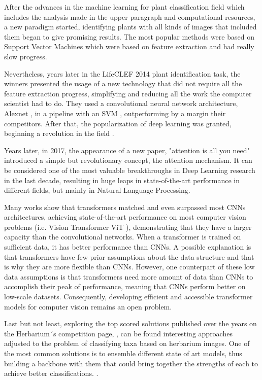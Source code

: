 \documentclass{article}
\begin{document}
After the advances in the machine learning for plant classification field which includes the analysis made in the upper paragraph and computational resources, a new paradigm started, identifying plants with all kinds of images that included them began to give promising results. The most popular methods were based on Support Vector Machines \cite{svm} which were based on feature extraction and had really slow progress. 

Nevertheless, years later in the LifeCLEF 2014 plant identification task, the winners presented the usage of a new technology that did not require all the feature extraction progress, simplifying and reducing all the work the computer scientist had to do. They used a convolutional neural network architecture, Alexnet \cite{alexnet}, in a pipeline with an SVM \cite{lifeclef2014}, outperforming by a margin their competitors. After that, the popularization of deep learning was granted, beginning a revolution in the field \cite{story}.

Years later, in 2017, the appearance of a new paper, "attention is all you need" \cite{transformers} introduced a simple but revolutionary concept, the attention mechanism. It can be considered one of the most valuable breakthroughs in Deep Learning research in the last decade, resulting in huge leaps in state-of-the-art performance in different fields, but mainly in Natural Language Processing.

Many works show that transformers matched and even surpassed most CNNs architectures, achieving state-of-the-art performance on most computer vision problems (i.e. Vision Transformer ViT \cite{vit}), demonstrating that they have a larger capacity than the convolutional networks. When a transformer is trained on sufficient data, it has better
performance than CNNs. A possible explanation is that transformers have few prior assumptions about the data structure and that is why they are more flexible than CNNs. However, one counterpart of these low data assumptions is that transformers need more amount of data than CNNs to accomplish their peak of performance, meaning that CNNs perform better on low-scale datasets. Consequently, developing efficient and accessible transformer models for computer vision remains an open problem.\cite{vit1,vit2}

Last but not least, exploring the top scored solutions published over the years on the Herbarium´s competition page, , can be found interesting approaches adjusted to the problem of classifying taxa based on herbarium images. One of the most common solutions is to ensemble different state of art models, thus building a backbone with them that could bring together the strengths of each to achieve better classifications. \cite{sol1, sol2, sol3}. 
\end{document}
